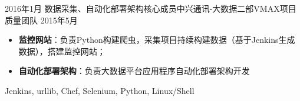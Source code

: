 \begin{experiences}
  \emptySeparator
  \experience
  {2016年1月} {数据采集、自动化部署架构核心成员}{中兴通讯-大数据二部}{VMAX项目质量团队}
  {2015年5月 }    {
                    \vskip 0.05cm
				  	\begin{itemize}\setlength{\itemsep}{0.15cm}
				  		\item \textbf{监控网站}：负责Python构建爬虫，采集项目持续构建数据（基于Jenkins生成数据），搭建监控网站；
				  		\item \textbf{自动化部署架构}：负责大数据平台应用程序自动化部署架构开发
				  	\end{itemize}
				  }
				  {Jenkins, urllib, Chef, Selenium, Python, Linux/Shell}

\end{experiences}

